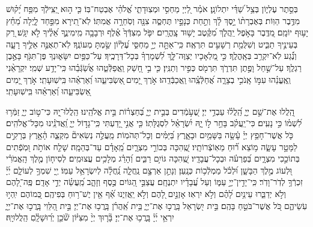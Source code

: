 \documentclass[twoside, openany, parskip=half, 11pt]{book}
\begin{document}
 
בְּסֵ֣תֶר עֶלְי֑וֹן בְּצֵ֥ל שַׁ֝דַּ֗י יִתְלוֹנָֽן׃
אֹמַ֗ר לַ֭יְיָ מַחְסִ֣י וּמְצֽוּדָתִ֑י אֱ֝לֹהַ֗י אֶבְטַח־בּֽוֹ׃
כִּ֤י ה֣וּא יַ֭צִּֽילְֿךָ מִפַּ֥ח יָ֝ק֗וּשׁ מִדֶּ֥בֶר הַוּֽוֹת׃
בְּאֶבְרָת֨וֹ יָ֣סֶךְ לָ֗ךְ וְתַ֣חַת כְּנָפָ֣יו תֶּחְסֶ֑ה צִנָּ֖ה וְסֹֽחֵרָ֣ה אֲמִתּֽוֹ׃
לֹֽא־תִ֭ירָא מִפַּ֣חַד לָ֑יְלָה מֵ֝חֵ֗ץ יָע֥וּף יוֹמָֽם׃
מִ֭דֶּֽבֶר בָּאֹ֣פֶל יַֽהֲלֹ֑ךְ מִ֝קֶּ֗טֶב יָשׁ֥וּד צָֽהֳרָֽיִם׃
יִפֹּ֤ל מִצִּדְּֿךָ֙ אֶ֗לֶף וּרְבָבָ֥ה מִֽימִינֶ֑ךָ אֵ֝לֶ֗יךָ לֹ֣א יִגָּֽשׁ׃
רַ֭ק בְּעֵינֶ֣יךָ תַבִּ֑יט וְשִׁלֻּמַ֖ת רְשָׁעִ֣ים תִּרְאֶֽה׃
כִּֽי־אַתָּ֣ה יְיָ֣ מַחְסִּ֑י עֶ֝לְי֗וֹן שַׂ֣מְתָּ מְעוֹנֶֽךָ׃
לֹֽא־תְאֻנֶּ֣ה אֵלֶ֣יךָ רָעָ֑ה וְנֶ֗֝גַע לֹֽא־יִקְרַ֥ב בְּאָֽהֳלֶֽךָ׃
כִּ֣י מַ֭לְאָכָיו יְצַוֶּה־לָּ֑ךְ לִ֝שְׁמָרְךָ֗ בְּכָל־דְּרָכֶֽיךָ׃
עַל־כַּפַּ֥יִם יִשָּׂא֑וּנְךָ פֶּן־תִּגֹּ֖ף בָּאֶ֣בֶן רַגְלֶֽךָ׃
עַל־שַׁ֣חַל וָפֶ֣תֶן תִּדְרֹ֑ךְ תִּרְמֹ֖ס כְּפִ֣יר וְתַנִּֽין׃
כִּ֤י בִ֣י חָ֭שַׁק וַֽאֲפַלְּֿטֵ֑הוּ אֲשַׂ֝גְּֿבֵ֗הוּ כִּֽי־יָדַ֥ע שְׁמִֽי׃
יִקְרָאֵ֨נִי וְֽאֶֽעֱנֵ֗הוּ עִמּ֣וֹ אָֽנֹכִ֣י בְצָרָ֑ה אֲ֝חַלְּֿצֵֽ֗הוּ וַֽאֲכַבְּֿדֵֽהוּ׃
אֹ֣רֶךְ יָ֭מִים ֖אַשְׂבִּיעֵ֑הוּ וְ֝אַרְאֵ֗הוּ בִּֽישֽׁוּעָתִֽי׃
אֹ֣רֶךְ יָ֭מִים ֖אַשְׂבִּיעֵ֑הוּ וְ֝אַרְאֵ֗הוּ בִּֽישֽׁוּעָתִֽי׃

 
הַֽ֭לֲלוּ אֶת־שֵׁ֣ם יְיָ֑ הַֽ֝לֲל֗וּ עַבְדֵ֥י יְיָ׃
שֶׁ֭עֹ֣מְֿדִים בְּבֵ֣ית יְיָ֑ בְּ֝חַצְר֗וֹת בֵּ֣ית אֱלֹהֵֽינוּ׃
הַֽלֲלוּ־֖יָהּ כִּי־ט֣וֹב יְיָ֑ זַמְּֿר֥וּ לִ֝שְׁמ֗וֹ כִּ֣י נָעִֽים׃
כִּי־יַֽעֲקֹ֗ב בָּחַ֣ר ל֣וֹ יָ֑הּ יִ֝שְׂרָאֵ֗ל לִסְגֻלָּתֽוֹ׃
כִּ֤י אֲנִ֣י יָ֭דַעְתִּי כִּֽי־גָד֣וֹל יְיָ֑ וַֽ֝אֲדֹנֵֽ֗ינוּ מִכָּל־אֱלֹהִֽים׃
כֹּ֤ל אֲשֶׁר־חָפֵ֥ץ יְיָ֗ עָ֫שָׂ֥ה בַּשָּׁמַ֥יִם וּבָאָ֑רֶץ בַּ֝יַּמִּ֗ים וְכָל־תְּהֹמֽוֹת׃
מַֽעֲלֶ֣ה נְשִׂאִים֘ מִקְצֵ֢ה הָ֫אָ֥רֶץ בְּרָקִ֣ים לַמָּטָ֣ר עָשָׂ֑ה מ֥וֹצֵא ר֝֗וּחַ מֵאֽוֹצְֿרוֹתָֽיו׃
שֶֽׁ֭הִכָּה בְּכוֹרֵ֣י מִצְרָ֑יִם מֵֽ֝אָדָ֗ם עַד־בְּהֵמָֽה׃
שָׁלַ֤ח אוֹתֹ֣ת וּ֭מֹֽפְֿתִים בְּתוֹכֵ֣כִי מִצְרָ֑יִם בְּ֝פַרְעֹ֗ה וּבְכָל־עֲבָדָֽיו׃
שֶֽׁ֭הִכָּה גּוֹיִ֣ם רַבִּ֑ים וְ֝הָרַ֗ג מְלָכִ֥ים עֲצוּמִֽים׃
לְסִיח֤וֹן מֶ֤לֶךְ הָֽאֱמֹרִ֗י וּ֭לְעוֹג מֶ֣לֶךְ הַבָּשָׁ֑ן וּ֝לְכֹ֗ל מַמְלְֿכ֥וֹת כְּנָֽעַן׃
וְנָתַ֣ן אַרְצָ֣ם נַֽחֲלָ֑ה נַֽ֝חֲלָ֗ה לְיִשְׂרָאֵ֥ל עַמּֽוֹ׃
יְ֖יָ שִׁמְךָ֣ לְעוֹלָ֑ם יְ֜יָ֗ זִכְרְֿךָ֥ לְדֹֽר־וָדֹֽר׃
כִּֽי־יָדִ֣ין־יְיָ֣ עַמּ֑וֹ וְעַל עֲ֝בָדָ֗יו יִתְנֶחָֽם׃
עֲצַבֵּ֣י הַ֭גּוֹיִם כֶּ֣סֶף וְזָהָ֑ב מַֽ֝עֲשֵׂ֗ה יְדֵ֣י אָדָֽם׃
פֶּֽה־לָ֭הֶם וְלֹ֣א יְדַבֵּ֑רוּ עֵינַ֥יִם לָ֝הֶ֗ם וְלֹ֣א יִרְאֽוּ׃
אָזְנַ֣יִם לָ֭הֶם וְלֹ֣א יַֽאֲזִי֑נוּ אַ֝֗ף אֵ֖ין יֶשׁ־ר֥וּחַ בְּפִיהֶֽם׃
כְּ֭מוֹהֶם יִֽהְי֣וּ עֹֽשֵׂיהֶ֑ם כֹּ֭ל אֲשֶׁר־בֹּטֵ֣חַ בָּהֶֽם׃
בֵּ֣ית יִ֭שְׂרָאֵל בָּֽרֲכ֣וּ אֶת־יְיָ֑ בֵּ֥ית אַֽ֝הֲרֹ֗ן בָּֽרֲכ֥וּ אֶת־יְיָ׃
בֵּ֣ית הַ֭לֵּוִי בָּֽרֲכ֣וּ אֶת־יְיָ֑ יִרְאֵ֥י יְ֜יָ֗ בָּֽרֲכ֥וּ אֶת־יְיָ׃
בָּ֘ר֤וּךְ יְיָ֨ מִצִּיּ֗וֹן שֹׁ֘כֵ֤ן יְרֽ֝וּשָׁלָֽ֗םִ הַֽלֲלוּיָֽהּ׃
\end{document}
